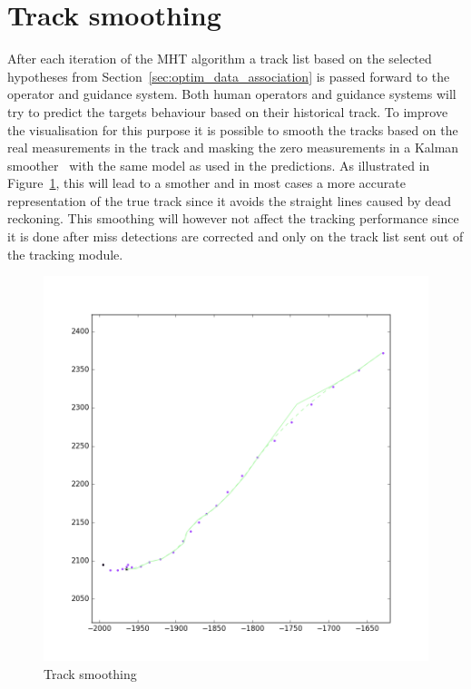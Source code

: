 \section{Track smoothing}
After each iteration of the MHT algorithm a track list based on the selected hypotheses from Section~\ref{sec:optim_data_association} is passed forward to the operator and guidance system. Both human operators and guidance systems will try to predict the targets behaviour based on their historical track. To improve the visualisation for this purpose it is possible to smooth the tracks based on the real measurements in the track and masking the zero measurements in a Kalman smoother~\cite{Brown2012} with the same model as used in the predictions. As illustrated in Figure~\ref{fig:track_smoothing}, this will lead to a smother and in most cases a more accurate representation of the true track since it avoids the straight lines caused by dead reckoning. This smoothing will however not affect the \gls{tracking} performance since it is done after miss detections are corrected and only on the track list sent out of the tracking module.
\begin{figure}
\centering
\includegraphics[width = .9\textwidth]{Figures/track_smoothing.png}
\caption{Track smoothing}\label{fig:track_smoothing}
\end{figure}
